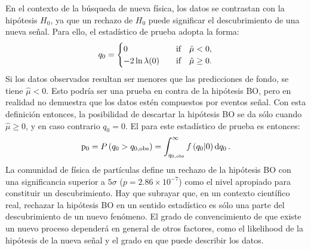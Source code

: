 En el contexto de la búsqueda de nueva física, los datos se contrastan con la hipótesis \(H_0\), ya que un rechazo de \(H_0\) puede significar el descubrimiento de una nueva señal. Para ello, el estadístico de prueba adopta la forma:
\begin{equation}
    q_0 = 
    \begin{cases}
        0 &\qif \hat{\mu} < 0,\\
        -2 \ln \lambda(0) &\qif \hat{\mu} \geq 0.
    \end{cases}
\end{equation}
Si los datos observados resultan ser menores que las predicciones de fondo, se tiene \(\hat{\mu} < 0\). Esto podría ser una prueba en contra de la hipótesis \ac{BO}, pero en realidad no demuestra que los datos estén compuestos por eventos señal. Con esta definición entonces, la posibilidad de descartar la hipótesis \ac{BO} se da sólo cuando \(\hat{\mu} \geq 0\), y en caso contrario \(q_0 = 0\). El \pval para este estadístico de prueba es entonces:
\begin{equation}
    \mathrm{p}_{0} = P \left( q_0 > q_{0, \text{obs}} \right) = \int_{q_{0, \text{obs}}}^{\infty} f \left(q_0 | 0 \right) \dd{q_0}.
\end{equation}
La comunidad de física de partículas define un rechazo de la hipótesis \ac{BO} con una significancia superior a \(5\sigma\) (\(p = 2.86 \times 10^{-7}\)) como el nivel apropiado para constituir un descubrimiento. Hay que subrayar que, en un contexto científico real, rechazar la hipótesis \ac{BO} en un sentido estadístico es sólo una parte del descubrimiento de un nuevo fenómeno. El grado de convencimiento de que existe un nuevo proceso dependerá en general de otros factores, como el likelihood de la hipótesis de la nueva señal y el grado en que puede describir los datos.



